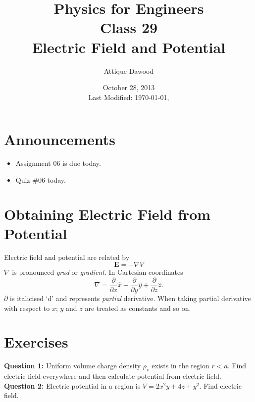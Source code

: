 \documentclass[12pt,a4paper]{article}
\title{\vspace{-3cm}Physics for Engineers\\Class 29\\Electric Field and Potential}
\author{Attique Dawood}
\date{October 28, 2013\\[0.2cm] Last Modified: \today, \currenttime}
\begin{document}
\maketitle
\section{Announcements}
\begin{itemize}
\item Assignment 06 is due today.
\item Quiz \#06 today.
\end{itemize}
\section{Obtaining Electric Field from Potential}
Electric field and potential are related by
\begin{equation}
\textbf{E}=-\nabla V
\end{equation}
$\nabla$ is pronounced \textit{grad} or \textit{gradient}. In Cartesian coordinates
\begin{equation}
\nabla=\dfrac{\partial}{\partial x}\hat x+\dfrac{\partial}{\partial y}\hat y+\dfrac{\partial}{\partial z}\hat z.
\end{equation}
$\partial$ is italicised `d' and represents \textit{partial} derivative. When taking partial derivative with respect to $x$; $y$ and $z$ are treated as constants and so on.
\section{Exercises}
\noindent\textbf{Question 1:} Uniform volume charge density $\rho_v$ exists in the region $r<a$. Find electric field everywhere and then calculate potential from electric field.\\[0.2cm]
\noindent\textbf{Question 2:} Electric potential in a region is $V=2x^2y+4z+y^2$. Find electric field.
%
%
\end{document}
